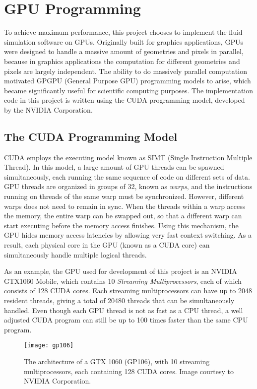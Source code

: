 \chapter{GPU Programming}

To achieve maximum performance, this project chooses to implement the fluid simulation software on GPUs. Originally built for graphics applications, GPUs were designed to handle a massive amount of geometries and pixels in parallel, because in graphics applications the computation for different geometries and pixels are largely independent. The ability to do massively parallel computation motivated GPGPU (General Purpose GPU) programming models to arise, which became significantly useful for scientific computing purposes. The implementation code in this project is written using the CUDA programming model, developed by the NVIDIA Corporation.

\section{The CUDA Programming Model}
CUDA employs the executing model known as SIMT (Single Instruction Multiple Thread). In this model, a large amount of GPU threads can be spawned simultaneously, each running the same sequence of code on different sets of data. GPU threads are organized in groups of 32, known as \textit{warps}, and the instructions running on threads of the same warp must be synchronized. However, different warps does not need to remain in sync. When the threads within a warp access the memory, the entire warp can be swapped out, so that a different warp can start executing before the memory access finishes. Using this mechanism, the GPU hides memory access latencies by allowing very fast context switching. As a result, each physical core in the GPU (known as a CUDA core) can simultaneously handle multiple logical threads.

As an example, the GPU used for development of this project is an NVIDIA GTX1060 Mobile, which contains 10 \textit{Streaming Multiprocessors}, each of which consists of 128 CUDA cores. Each streaming multiprocessors can have up to 2048 resident threads, giving a total of 20480 threads that can be simultaneously handled. Even though each GPU thread is not as fast as a CPU thread, a well adjusted CUDA program can still be up to 100 times faster than the same CPU program.


\begin{figure}[h]
    \centering
    \texttt{[image: gp106]}
    \caption{The architecture of a GTX 1060 (GP106), with 10 streaming multiprocessors, each containing 128 CUDA cores. Image courtesy to NVIDIA Corporation.}
    \label{figure GTX1060}
\end{figure}



